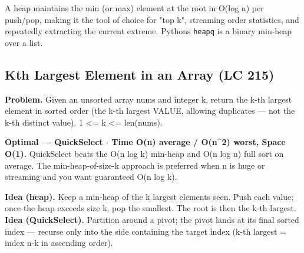 \documentclass[11pt]{article}
\begin{document}
A heap maintains the min (or max) element at the root in O(log n) per push/pop, making it the tool of choice for "top k", streaming order statistics, and repeatedly extracting the current extreme. Python\textquotesingle s \texttt{heapq} is a binary min-heap over a list.

\subsection{Kth Largest Element in an Array (LC 215)}\label{kth-largest-element-in-an-array-lc-215}

\textbf{Problem.} Given an unsorted array nums and integer k, return the k-th largest element in sorted order (the k-th largest VALUE, allowing duplicates --- not the k-th distinct value). 1 \textless= k \textless= len(nums).

\textbf{Optimal --- QuickSelect \(\cdot\) Time O(n) average / O(n\^{}2) worst, Space O(1).} QuickSelect beats the O(n log k) min-heap and O(n log n) full sort on average. The min-heap-of-size-k approach is preferred when n is huge or streaming and you want guaranteed O(n log k).

\textbf{Idea (heap).} Keep a min-heap of the k largest elements seen. Push each value; once the heap exceeds size k, pop the smallest. The root is then the k-th largest. \textbf{Idea (QuickSelect).} Partition around a pivot; the pivot lands at its final sorted index --- recurse only into the side containing the target index (k-th largest = index n-k in ascending order).

\end{document}
